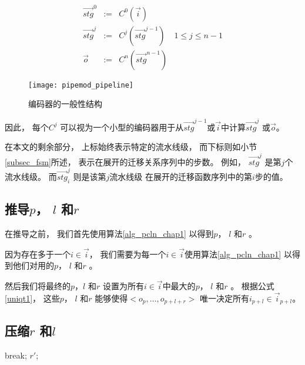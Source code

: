 \begin{equation}\label{equ_genpipe}
\begin{array}{cccc}
\vec{stg}^0   & := & C^0(\vec{i})         &\\
\vec{stg}^j   & := & C^j(\vec{stg}^{j-1}) & 1\le j\le n-1\\
\vec{o}       & := & C^n(\vec{stg}^{n-1}) &
\end{array}
\end{equation}


\begin{figure}[b]
\begin{center}
\texttt{[image: pipemod\_pipeline]}
\end{center}
\caption{编码器的一般性结构}
  \label{fig_pipeenc_chap4}
\end{figure}


因此，
每个$C^j$ 可以视为一个小型的编码器用于从$\vec{stg}^{j-1}$或$\vec{i}$中计算$\vec{stg}^j$ 或$\vec{o}$。


在本文的剩余部分，
上标始终表示特定的流水线级，
而下标则如小节\ref{subsec_fsm}所述，
表示在展开的迁移关系序列中的步数。
例如，
$\vec{stg}^j$ 是第$j$个流水线级。
而$\vec{stg}^j_i$ 则是该第$j$流水线级
在展开的迁移函数序列中的第$i$步的值。

\subsection{推导$p$， $l$ 和$r$}\label{subsec_inferplr}
在推导之前，
我们首先使用算法\ref{alg_pcln_chap1} 以得到$p$， $l$ 和$r$ 。

因为存在多于一个$i\in \vec{i}$，
我们需要为每一个$i\in \vec{i}$使用算法\ref{alg_pcln_chap1}
以得到他们对用的$p$， $l$ 和$r$ 。

然后我们将最终的$p$，$l$ 和$r$ 设置为所有$i\in \vec{i}$中最大的$p$， $l$ 和$r$ 。
根据公式\ref{uniqt1}，
这些$p$， $l$ 和$r$ 能够使得$<o_{p},\dots,o_{p+l+r}>$ 唯一决定所有$i_{p+l}\in \vec{i}_{p+l}$。


\subsection{压缩$r$ 和$l$}\label{reduceing}

\begin{algorithm}[t]
\begin{algorithmic}[1]
\label{testr_1}
  \STATE  break;
  \ENDIF
\ENDFOR
\RETURN $r'$;
\caption{$RemoveRedundancy(p,l,r)$}
\label{algo_remove2_chap4}
\end{algorithmic}
\end{algorithm}



